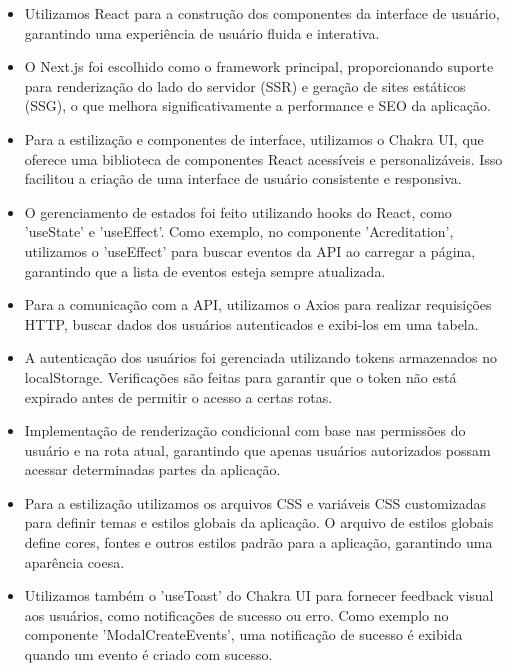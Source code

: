 \begin{itemize}

\item Utilizamos React para a construção dos componentes da interface de usuário, garantindo uma experiência de usuário fluida e interativa.

\item O Next.js foi escolhido como o framework principal, proporcionando suporte para renderização do lado do servidor (SSR) e geração de sites estáticos (SSG), o que melhora significativamente a performance e SEO da aplicação.

\item Para a estilização e componentes de interface, utilizamos o Chakra UI, que oferece uma biblioteca de componentes React acessíveis e personalizáveis. Isso facilitou a criação de uma interface de usuário consistente e responsiva.

\item O gerenciamento de estados foi feito utilizando hooks do React, como 'useState' e 'useEffect'. Como exemplo, no componente 'Acreditation', utilizamos o 'useEffect' para buscar eventos da API ao carregar a página, garantindo que a lista de eventos esteja sempre atualizada.

\item Para a comunicação com a API, utilizamos o Axios para realizar requisições HTTP, buscar dados dos usuários autenticados e exibi-los em uma tabela.

\item A autenticação dos usuários foi gerenciada utilizando tokens armazenados no localStorage. Verificações são feitas para garantir que o token não está expirado antes de permitir o acesso a certas rotas.

\item Implementação de renderização condicional com base nas permissões do usuário e na rota atual, garantindo que apenas usuários autorizados possam acessar determinadas partes da aplicação.

\item Para a estilização utilizamos os arquivos CSS e variáveis CSS customizadas para definir temas e estilos globais da aplicação. O arquivo de estilos globais define cores, fontes e outros estilos padrão para a aplicação, garantindo uma aparência coesa.

\item Utilizamos também o 'useToast' do Chakra UI para fornecer feedback visual aos usuários, como notificações de sucesso ou erro. Como exemplo no componente 'ModalCreateEvents', uma notificação de sucesso é exibida quando um evento é criado com sucesso.


\end{itemize}
